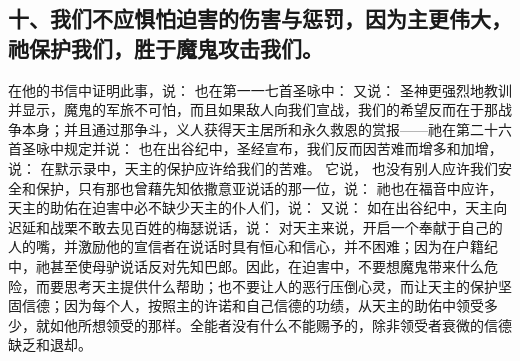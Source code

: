 
\subsection{十、我们不应惧怕迫害的伤害与惩罚，因为主更伟大，祂保护我们，胜于魔鬼攻击我们。}

在他的书信中证明此事，说：  也在第一一七首圣咏中： 又说： 圣神更强烈地教训并显示，魔鬼的军旅不可怕，而且如果敌人向我们宣战，我们的希望反而在于那战争本身；并且通过那争斗，义人获得天主居所和永久救恩的赏报——祂在第二十六首圣咏中规定并说： 也在出谷纪中，圣经宣布，我们反而因苦难而增多和加增，说：  在默示录中，天主的保护应许给我们的苦难。 它说，  也没有别人应许我们安全和保护，只有那也曾藉先知依撒意亚说话的那一位，说：  祂也在福音中应许，天主的助佑在迫害中必不缺少天主的仆人们，说：  又说：  如在出谷纪中，天主向迟延和战栗不敢去见百姓的梅瑟说话，说：  对天主来说，开启一个奉献于自己的人的嘴，并激励他的宣信者在说话时具有恒心和信心，并不困难；因为在户籍纪中，祂甚至使母驴说话反对先知巴郎。因此，在迫害中，不要想魔鬼带来什么危险，而要思考天主提供什么帮助；也不要让人的恶行压倒心灵，而让天主的保护坚固信德；因为每个人，按照主的许诺和自己信德的功绩，从天主的助佑中领受多少，就如他所想领受的那样。全能者没有什么不能赐予的，除非领受者衰微的信德缺乏和退却。\par

